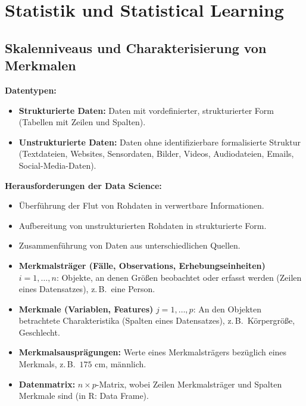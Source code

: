 \section{Statistik und Statistical Learning}

\subsection{Skalenniveaus und Charakterisierung von Merkmalen}

\textbf{Datentypen:}
\begin{itemize}[leftmargin=1.5em]
    \item \textbf{Strukturierte Daten:} Daten mit vordefinierter, strukturierter Form (Tabellen mit Zeilen und Spalten).
    \item \textbf{Unstrukturierte Daten:} Daten ohne identifizierbare formalisierte Struktur (Textdateien, Websites, Sensordaten, Bilder, Videos, Audiodateien, Emails, Social-Media-Daten).
\end{itemize}

\textbf{Herausforderungen der Data Science:}
\begin{itemize}[leftmargin=1.5em]
    \item Überführung der Flut von Rohdaten in verwertbare Informationen.
    \item Aufbereitung von unstrukturierten Rohdaten in strukturierte Form.
    \item Zusammenführung von Daten aus unterschiedlichen Quellen.
\end{itemize}

\begin{itemize}[leftmargin=1.5em]
    \item \textbf{Merkmalsträger (Fälle, Observations, Erhebungseinheiten)} $i = 1, \ldots, n$: Objekte, an denen Größen beobachtet oder erfasst werden (Zeilen eines Datensatzes), z.\,B.\ eine Person.
    \item \textbf{Merkmale (Variablen, Features)} $j = 1, \ldots, p$: An den Objekten betrachtete Charakteristika (Spalten eines Datensatzes), z.\,B.\ Körpergröße, Geschlecht.
    \item \textbf{Merkmalsausprägungen:} Werte eines Merkmalsträgers bezüglich eines Merkmals, z.\,B.\ $175$ cm, männlich.
    \item \textbf{Datenmatrix:} $n \times p$-Matrix, wobei Zeilen Merkmalsträger und Spalten Merkmale sind (in R: Data Frame).
\end{itemize}

